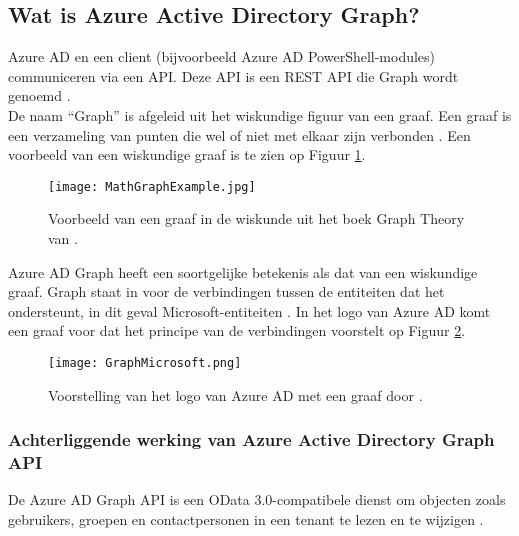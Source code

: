 \subsection{Wat is Azure Active Directory Graph?}


Azure \ac{AD} en een client (bijvoorbeeld Azure \ac{AD} PowerShell-modules) communiceren via een \ac{API}. Deze \ac{API} is een \ac{REST} \ac{API} die Graph wordt genoemd \autocite{Microsoft2015}. \\ 

De naam “Graph” is afgeleid uit het wiskundige figuur van een graaf. Een graaf is een verzameling van punten die wel of niet met elkaar zijn verbonden \autocite{Denaux2022}. Een voorbeeld van een wiskundige graaf is te zien op Figuur \ref{mga}. \\

\begin{figure}[h!]
    \texttt{[image: MathGraphExample.jpg]}
    \caption[Voorbeeld wiskundige graaf]{Voorbeeld van een graaf in de wiskunde uit het boek Graph Theory van \textcite{Diestel2010}.}
    \label{mga}
\end{figure}

Azure \ac{AD} Graph heeft een soortgelijke betekenis als dat van een wiskundige graaf. Graph staat in voor de verbindingen tussen de entiteiten dat het ondersteunt, in dit geval Microsoft-entiteiten \autocite{Kokkarinen2022}. In het logo van Azure \ac{AD} komt een graaf voor dat het principe van de verbindingen voorstelt op Figuur \ref{gms}. \\

\begin{figure}[h!]
    \texttt{[image: GraphMicrosoft.png]}
    \caption[Logo Azure Active Directory]{Voorstelling van het logo van Azure \Ac{AD} met een graaf door \textcite{Microsoftb}.}
    \label{gms}
\end{figure}



\subsubsection{Achterliggende werking van Azure Active Directory Graph API}


De Azure \ac{AD} Graph \ac{API} is een OData 3.0-compatibele dienst om objecten zoals gebruikers, groepen en contactpersonen in een tenant te lezen en te wijzigen \autocite{Microsoft2016}. \\


